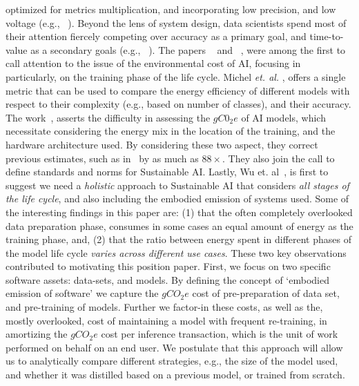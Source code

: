 optimized for metrics multiplication, and incorporating low precision, and low voltage (e.g., ~\cite{7738674,888701}). Beyond 
the lens of system design, data scientists spend most of their attention 
fiercely competing over accuracy as a primary goal, and time-to-value as a secondary goals (e.g., ~\cite{liu2019roberta}). The papers ~\cite{Strubell-policy-19} and ~\cite{schwartz2019green}, were among the first to call attention to the issue of the environmental cost of AI, focusing in particularly, on the training phase of the life cycle. Michel {\it et. al.} \cite{Lenherr2021new}, offers a single metric that can be used to compare the energy efficiency of different models with respect to their complexity (e.g., based on number of classes), and their accuracy. The work~\cite{patterson2021carbon}, asserts the difficulty in assessing the $gC0_2e$ of AI models, which necessitate considering the energy mix in the location of the training, and the hardware architecture used. By considering these two aspect, they correct previous estimates, such as in~\cite{Strubell-policy-19} by as much as $88\times$.
They also join the call to define standards and norms for Sustainable AI. Lastly, Wu et. al~\cite{Wu2022}, is first to suggest we need
a {\em holistic} approach to Sustainable AI that considers {\em all stages
of the life cycle}, and also including the embodied emission of systems used. Some of the interesting findings in this paper are: (1) that the often completely overlooked data preparation phase, consumes in some cases an equal amount of energy as the training phase, and, (2) that the ratio between energy spent in different phases of the model life cycle  {\em varies across different use cases}. These two key observations contributed to motivating this position paper. First, we focus on two specific software assets: data-sets, and models. By defining the concept of `embodied emission of software' we capture the $gCO_2e$ cost of pre-preparation of data set, and 
pre-training of models. Further we factor-in these costs, as well as the, mostly overlooked, cost of maintaining a model with frequent re-training, in amortizing the $gCO_2e$ cost per inference transaction, which is the unit of work performed on behalf on an end user. We postulate that this  approach will allow us to analytically compare different 
strategies, e.g., the size of the model used, and whether it was distilled based on a previous model, or trained from scratch.  

